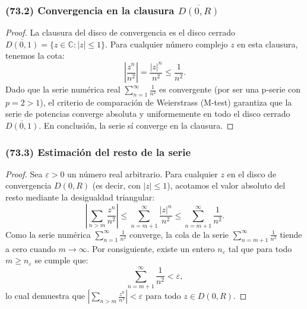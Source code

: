 \documentclass[11pt,a4paper]{article}
\theoremstyle{definition}
\theoremstyle{plain}
\theoremstyle{remark}
\begin{document}
	\subsubsection*{(73.2) Convergencia en la clausura $\overline{D(0, R)}$}
	\begin{proof}
		La clausura del disco de convergencia es el disco cerrado $\overline{D(0, 1)} = \{z \in \mathbb{C} : |z| \le 1\}$. Para cualquier número complejo $z$ en esta clausura, tenemos la cota:
		\[
		\left| \frac{z^n}{n^2} \right| = \frac{|z|^n}{n^2} \le \frac{1}{n^2}.
		\]
		Dado que la serie numérica real $\sum_{n=1}^\infty \frac{1}{n^2}$ es convergente (por ser una p-serie con $p = 2 > 1$), el criterio de comparación de Weierstrass (M-test) garantiza que la serie de potencias converge absoluta y uniformemente en todo el disco cerrado $\overline{D(0, 1)}$. En conclusión, la serie sí converge en la clausura.
	\end{proof}
	
	\subsubsection*{(73.3) Estimación del resto de la serie}
	\begin{proof}
		Sea $\varepsilon > 0$ un número real arbitrario. Para cualquier $z$ en el disco de convergencia $D(0, R)$ (es decir, con $|z| \le 1$), acotamos el valor absoluto del resto mediante la desigualdad triangular:
		\[
		\left| \sum_{n>m} \frac{z^n}{n^2} \right| \le \sum_{n=m+1}^\infty \frac{|z|^n}{n^2} \le \sum_{n=m+1}^\infty \frac{1}{n^2}.
		\]
		Como la serie numérica $\sum_{n=1}^\infty \frac{1}{n^2}$ converge, la cola de la serie $\sum_{n=m+1}^\infty \frac{1}{n^2}$ tiende a cero cuando $m \to \infty$. Por consiguiente, existe un entero $n_\varepsilon$ tal que para todo $m \ge n_\varepsilon$ se cumple que:
		\[
		\sum_{n=m+1}^\infty \frac{1}{n^2} < \varepsilon,
		\]
		lo cual demuestra que $\left| \sum_{n>m} \frac{z^n}{n^2} \right| < \varepsilon$ para todo $z \in D(0, R)$.
	\end{proof}
	
\end{document}
